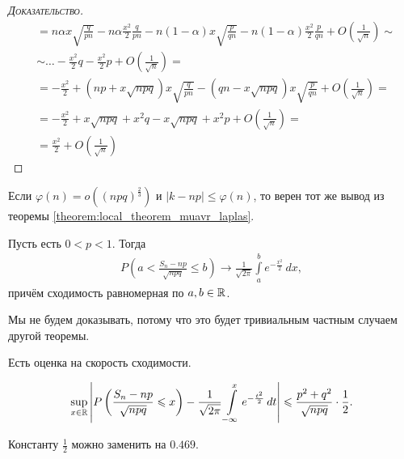 \documentclass[../main.tex]{subfiles}
\begin{document}
\begin{proof}[\normalfont\textsc{Доказательство}]
\begin{align*}
  &= n\alpha x \sqrt{\frac{q}{pn}} - n\alpha \frac{x^{2}}{2}\frac{q}{pn} - n(1-\alpha)x \sqrt{\frac{p}{qn}} - n(1-\alpha)\frac{x^{2}}{2} \frac{p}{qn} + O\left(\frac{1}{\sqrt{n}}\right) \sim \\
  &\sim \ldots - \frac{x^{2}}{2}q - \frac{x^{2}}{2}p + O\left(\frac{1}{\sqrt{n}}\right) = \\
  &= -\frac{x^{2}}{2} + \left( np + x\sqrt{npq} \right)x \sqrt{\frac{q}{pn}} - (qn - x\sqrt{npq})x\sqrt{\frac{p}{qn}} + O \left( \frac{1}{\sqrt{n}} \right) = \\
  &= -\frac{x^{2}}{2} + x\sqrt{npq} + x^{2}q - x\sqrt{npq} + x^{2}p + O \left( \frac{1}{\sqrt{n}} \right) = \\
  &= \frac{x^{2}}{2} + O \left( \frac{1}{\sqrt{n}} \right)
 \end{align*} 
\end{proof}

\begin{remrk}
 Если $\varphi(n) = o((npq)^{\frac{2}{3}})$ и $\left| k-np \right| \leqslant \varphi(n)$, то верен тот же вывод из теоремы \ref{theorem:local_theorem_muavr_laplas}.
\end{remrk}

\begin{thm}
 \label{theorem:intergram_theorem_muavr_laplas}
 Пусть есть $0 < p < 1$. Тогда
 \begin{align*}
  P\left(a < \frac{S_n - np}{\sqrt{npq}} \leqslant b\right) \to \frac{1}{\sqrt{2\pi}} \int\limits_{a}^{b} e^{-\frac{x^{2}}{2}}\,dx
 ,\end{align*} причём сходимость равномерная по $a, b \in \mathbb{R}$.
\end{thm}

Мы не будем доказывать, потому что это будет тривиальным частным случаем другой теоремы.

Есть оценка на скорость сходимости.

\begin{thm}
 \begin{align*}
  \sup_{x \in \mathbb{R}} \left| P \left( \frac{S_n - np}{\sqrt{npq}} \leqslant x \right) - \frac{1}{\sqrt{2\pi}} \int\limits_{-\infty}^{x} e^{-\frac{t^{2}}{2}}\, dt \right| \leqslant \frac{p^{2}+q^{2}}{\sqrt{npq}} \cdot \frac{1}{2}
 .\end{align*}
\end{thm}

\begin{remrk*}
 Константу $\frac{1}{2}$ можно заменить на $0.469$.
\end{remrk*}
\end{document}

